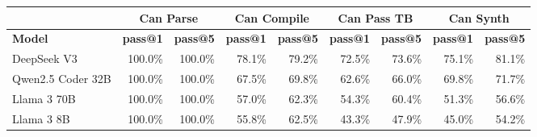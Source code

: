 \begin{tabular}{l|rr|rr|rr|rr}
\cmidrule[\heavyrulewidth]{2-9}
 & \multicolumn{2}{c|}{\textbf{Can Parse}} & \multicolumn{2}{c|}{\textbf{Can Compile}} & \multicolumn{2}{c|}{\textbf{Can Pass TB}} & \multicolumn{2}{c}{\textbf{Can Synth}} \\
\midrule
 \textbf{Model} & \textbf{pass@1} & \textbf{pass@5} & \textbf{pass@1} & \textbf{pass@5} & \textbf{pass@1} & \textbf{pass@5} & \textbf{pass@1} & \textbf{pass@5} \\
\midrule
DeepSeek V3 & 100.0\% & 100.0\% & 78.1\% & 79.2\% & 72.5\% & 73.6\% & 75.1\% & 81.1\% \\
Qwen2.5 Coder 32B & 100.0\% & 100.0\% & 67.5\% & 69.8\% & 62.6\% & 66.0\% & 69.8\% & 71.7\% \\
Llama 3 70B & 100.0\% & 100.0\% & 57.0\% & 62.3\% & 54.3\% & 60.4\% & 51.3\% & 56.6\% \\
Llama 3 8B & 100.0\% & 100.0\% & 55.8\% & 62.5\% & 43.3\% & 47.9\% & 45.0\% & 54.2\% \\
\bottomrule
\end{tabular}